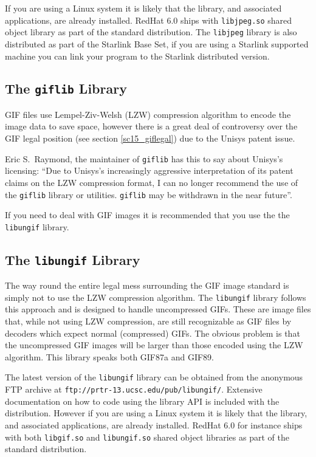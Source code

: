 \documentclass[twoside,11pt]{article}
\newcommand{\htmladdnormallink}[2]{#1}
\newcommand{\htmlref}[2]{#1}
\newcommand{\latex}[1]{#1}
\newcommand{\xlabel}[1]{}
\begin{document}
If you are using a Linux system it is likely that the library, and associated applications, are already installed. RedHat 6.0 ships with {\tt libjpeg.so} shared object library as part of the standard distribution. The {\tt libjpeg} library is also distributed as part of the Starlink Base Set, if you are using a Starlink supported machine you can link your program to the Starlink distributed version.

\subsection{\xlabel{sc15_libgif}The {\tt giflib} Library\label{sc15_libgif}}

GIF files use Lempel-Ziv-Welsh (LZW) compression algorithm to encode the image data to save space, however there is a great deal of controversy over the GIF \htmlref{legal position}{sc15_giflegal} \latex{(see section \ref{sc15_giflegal})} due to the Unisys patent issue. 

Eric S.\ Raymond, the maintainer of {\tt giflib} has this to say about Unisys's licensing: ``Due to Unisys's increasingly aggressive interpretation of its \htmlref{patent claims}{sc15_giflegal} on the LZW compression format, I can no longer recommend the use of the {\tt giflib} library or utilities. {\tt giflib} may be withdrawn in the near future''.

If you need to deal with GIF images it is recommended that you use the the \htmlref{{\tt libungif}}{sc15_libungif} library.

\subsection{\xlabel{sc15_libungif}The {\tt libungif} Library\label{sc15_libungif}}

The way round the entire \htmlref{legal mess}{sc15_giflegal} surrounding the GIF image standard is simply not to use the LZW compression algorithm. The {\tt libungif} library follows this approach and is designed to handle uncompressed GIFs. These are image files that, while not using LZW compression, are still recognizable as GIF files by decoders which expect normal (compressed) GIFs. The obvious problem is that the uncompressed GIF images will be larger than those encoded using the LZW algorithm. This library speaks both GIF87a and GIF89. 

The latest version of the {\tt libungif} library can be obtained from the anonymous FTP archive at
\htmladdnormallink{{\tt ftp://prtr-13.ucsc.edu/pub/libungif/}}{ftp://prtr-13.ucsc.edu/pub/libungif/}. Extensive documentation on how to code using the library API is included with the distribution. However if you are using a Linux system it is likely that the library, and associated applications, are already installed.
RedHat 6.0 for instance ships with both {\tt libgif.so} and {\tt libungif.so} shared object libraries as part of the standard distribution.
\end{document}

